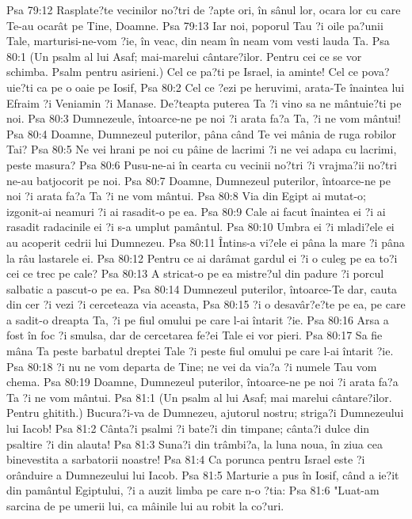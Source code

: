 Psa 79:12  Rasplate?te vecinilor no?tri de ?apte ori, în sânul lor, ocara lor cu care Te-au ocarât pe Tine, Doamne.
Psa 79:13  Iar noi, poporul Tau ?i oile pa?unii Tale, marturisi-ne-vom ?ie, în veac, din neam în neam vom vesti lauda Ta.
Psa 80:1  (Un psalm al lui Asaf; mai-marelui cântare?ilor. Pentru cei ce se vor schimba. Psalm pentru asirieni.) Cel ce pa?ti pe Israel, ia aminte! Cel ce pova?uie?ti ca pe o oaie pe Iosif,
Psa 80:2  Cel ce ?ezi pe heruvimi, arata-Te înaintea lui Efraim ?i Veniamin ?i Manase. De?teapta puterea Ta ?i vino sa ne mântuie?ti pe noi.
Psa 80:3  Dumnezeule, întoarce-ne pe noi ?i arata fa?a Ta, ?i ne vom mântui!
Psa 80:4  Doamne, Dumnezeul puterilor, pâna când Te vei mânia de ruga robilor Tai?
Psa 80:5  Ne vei hrani pe noi cu pâine de lacrimi ?i ne vei adapa cu lacrimi, peste masura?
Psa 80:6  Pusu-ne-ai în cearta cu vecinii no?tri ?i vrajma?ii no?tri ne-au batjocorit pe noi.
Psa 80:7  Doamne, Dumnezeul puterilor, întoarce-ne pe noi ?i arata fa?a Ta ?i ne vom mântui.
Psa 80:8  Via din Egipt ai mutat-o; izgonit-ai neamuri ?i ai rasadit-o pe ea.
Psa 80:9  Cale ai facut înaintea ei ?i ai rasadit radacinile ei ?i s-a umplut pamântul.
Psa 80:10  Umbra ei ?i mladi?ele ei au acoperit cedrii lui Dumnezeu.
Psa 80:11  Întins-a vi?ele ei pâna la mare ?i pâna la râu lastarele ei.
Psa 80:12  Pentru ce ai darâmat gardul ei ?i o culeg pe ea to?i cei ce trec pe cale?
Psa 80:13  A stricat-o pe ea mistre?ul din padure ?i porcul salbatic a pascut-o pe ea.
Psa 80:14  Dumnezeul puterilor, întoarce-Te dar, cauta din cer ?i vezi ?i cerceteaza via aceasta,
Psa 80:15  ?i o desavâr?e?te pe ea, pe care a sadit-o dreapta Ta, ?i pe fiul omului pe care l-ai întarit ?ie.
Psa 80:16  Arsa a fost în foc ?i smulsa, dar de cercetarea fe?ei Tale ei vor pieri.
Psa 80:17  Sa fie mâna Ta peste barbatul dreptei Tale ?i peste fiul omului pe care l-ai întarit ?ie.
Psa 80:18  ?i nu ne vom departa de Tine; ne vei da via?a ?i numele Tau vom chema.
Psa 80:19  Doamne, Dumnezeul puterilor, întoarce-ne pe noi ?i arata fa?a Ta ?i ne vom mântui.
Psa 81:1  (Un psalm al lui Asaf; mai marelui cântare?ilor. Pentru ghitith.) Bucura?i-va de Dumnezeu, ajutorul nostru; striga?i Dumnezeului lui Iacob!
Psa 81:2  Cânta?i psalmi ?i bate?i din timpane; cânta?i dulce din psaltire ?i din alauta!
Psa 81:3  Suna?i din trâmbi?a, la luna noua, în ziua cea binevestita a sarbatorii noastre!
Psa 81:4  Ca porunca pentru Israel este ?i orânduire a Dumnezeului lui Iacob.
Psa 81:5  Marturie a pus în Iosif, când a ie?it din pamântul Egiptului, ?i a auzit limba pe care n-o ?tia:
Psa 81:6  "Luat-am sarcina de pe umerii lui, ca mâinile lui au robit la co?uri.
